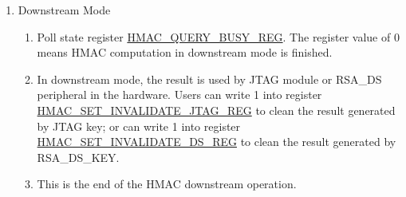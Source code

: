 \documentclass[main\_\_EN.tex]{subfiles}
\begin{document}
\begin{enumerate}
    \item Downstream Mode
    \begin{enumerate}
        \item Poll state register \hyperref[regdesc:HMACQUERYBUSYREG]{HMAC\_QUERY\_BUSY\_REG}. The register value of 0 means HMAC computation in downstream mode is finished.
        \item In downstream mode, the result is used by JTAG module or RSA\_DS peripheral in the hardware. Users can write 1 into register \hyperref[regdesc:HMACSETINVALIDATEJTAGREG]{HMAC\_SET\_INVALIDATE\_JTAG\_REG} to clean the result generated by JTAG key; or can write 1 into register \hyperref[regdesc:HMACSETINVALIDATEDSREG]{HMAC\_SET\_INVALIDATE\_DS\_REG} to clean the result generated by RSA\_DS\_KEY.
        \item This is the end of the HMAC downstream operation.
    \end{enumerate}


\end{enumerate}
\end{document}
